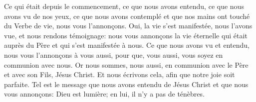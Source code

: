 Ce qui était depuis le commencement,
	ce que nous avons entendu, ce que nous avons vu de nos yeux,
	ce que nous avons contemplé et que nos mains ont touché du Verbe de vie,
	nous vous l’annonçons.
Oui, la vie s’est manifestée, nous l’avons vue, et nous rendons témoignage:
	nous vous annonçons la vie éternelle qui était auprès du Père
	et qui s’est manifestée à nous.
Ce que nous avons vu et entendu, nous vous l’annonçons à vous aussi,
	pour que, vous aussi, vous soyez en communion avec nous.
Or nous sommes, nous aussi, en communion avec le Père
	et avec son Fils, Jésus Christ.
Et nous écrivons cela, afin que notre joie soit parfaite.
Tel est le message que nous avons entendu de Jésus Christ et que nous vous annonçons:
	Dieu est lumière; en lui, il n’y a pas de ténèbres.
